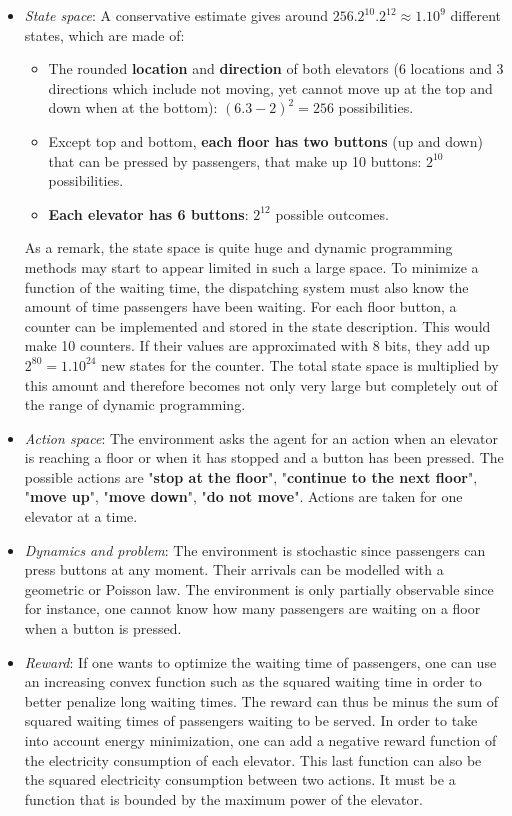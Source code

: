 \documentclass[a4paper]{article}
\begin{document}
\begin{itemize}
	\item \emph{State space}: A conservative estimate gives around $256.2^{10}.2^{12} \approx 1.10^9$ different states, which are made of: 
	\begin{itemize}
		\item The rounded \textbf{location} and \textbf{direction} of both elevators (6 locations and 3 directions which include not moving, yet cannot move up at the top and down when at the bottom): $(6.3 - 2)^2=256$ possibilities.
		\item Except top and bottom, \textbf{each floor has two buttons} (up and down) that can be pressed by passengers, that make up 10 buttons: $2^{10}$ possibilities.
		\item \textbf{Each elevator has 6 buttons}: $2^{12}$ possible outcomes.
	\end{itemize}
	As a remark, the state space is quite huge and dynamic programming methods may start to appear limited in such a large space.
	To minimize a function of the waiting time, the dispatching system must also know the amount of time passengers have been waiting. For each floor button, a counter can be implemented and stored in the state description. This would make 10 counters. If their values are approximated with 8 bits, they add up $2^{80} = 1.10^{24}$ new states for the counter. The total state space is multiplied by this amount and therefore becomes not only very large but completely out of the range of dynamic programming.
	
	\item \emph{Action space}: The environment asks the agent for an action when an elevator is reaching a floor or when it has stopped and a button has been pressed. The possible actions are "\textbf{stop at the floor}", "\textbf{continue to the next floor}", "\textbf{move up}", "\textbf{move down}", "\textbf{do not move}". Actions are taken for one elevator at a time.
	
	\item \emph{Dynamics and problem}: The environment is stochastic since passengers can press buttons at any moment. Their arrivals can be modelled with a geometric or Poisson law. The environment is only partially observable since for instance, one cannot know how many passengers are waiting on a floor when a button is pressed.
	
	\item \emph{Reward}: If one wants to optimize the waiting time of passengers, one can use an increasing convex function such as the squared waiting time in order to better penalize long waiting times. The reward can thus be minus the sum of squared waiting times of passengers waiting to be served. In order to take into account energy minimization, one can add a negative reward function of the electricity consumption of each elevator. This last function can also be the squared electricity consumption between two actions. It must be a function that is bounded by the maximum power of the elevator.
\end{itemize}
\end{document}
